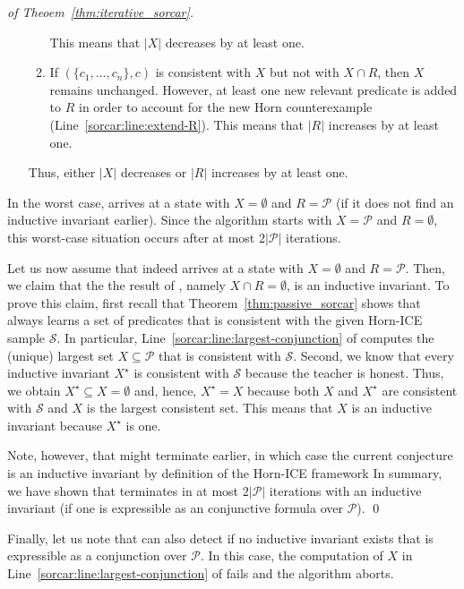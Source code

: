 \begin{proof}[of Theoem~\ref{thm:iterative_sorcar}]
\begin{itemize}
\begin{enumerate}
	    This means that $|X|$ decreases by at least one.
        \item If $(\{ c_1, \ldots, c_n \}, c)$ is consistent with $X$ but not with $X \cap R$, then
        $X$ remains unchanged.
        However, at least one new relevant predicate is added to $R$ in order to account for the new Horn counterexample (Line~\ref{sorcar:line:extend-R}).
        This means that $|R|$ increases by at least one.
	\end{enumerate}
	Thus, either $|X|$ decreases or $|R|$ increases by at least one.
\end{itemize}
In the worst case, \SorcarIterative arrives at a state with $X = \emptyset$ and $R = \mathcal P$ (if it does not find an inductive invariant earlier).
Since the algorithm starts with $X = \mathcal P$ and $R = \emptyset$, this worst-case situation occurs after at most $2 |\mathcal P|$ iterations.

Let us now assume that \SorcarIterative indeed arrives at a state with $X = \emptyset$ and $R = \mathcal P$. 
Then, we claim that the the result of \SorcarIterative, namely $X \cap R = \emptyset$, is an inductive invariant.
To prove this claim, first recall that Theorem~\ref{thm:passive_sorcar} shows that \SorcarPassive always learns a set of predicates that is consistent with the given Horn-ICE sample $\mathcal S$.
In particular, Line~\ref{sorcar:line:largest-conjunction} of \SorcarPassive computes the (unique) largest set $X \subseteq \mathcal P$ that is consistent with $\mathcal S$.
Second, we know that every inductive invariant $X^\star$ is consistent with $\mathcal S$ because the teacher is honest.
Thus, we obtain $X^\star \subseteq X = \emptyset$ and, hence, $X^\star = X$ because both $X$ and $X^\star$ are consistent with $\mathcal S$ and $X$ is the largest consistent set.
This means that $X$ is an inductive invariant because $X^\star$ is one.

Note, however, that \SorcarIterative might terminate earlier, in which case the current conjecture is an inductive invariant by definition of the Horn-ICE framework
In summary, we have shown that \SorcarIterative terminates in at most $2 |\mathcal P|$ iterations with an inductive invariant (if one is expressible as an conjunctive formula over $\mathcal P$).
\qed
\end{proof}

Finally, let us note that \SorcarIterative can also detect if no inductive invariant exists that is expressible as a conjunction over $\mathcal P$.
In this case, the computation of $X$ in Line~\ref{sorcar:line:largest-conjunction} of \SorcarPassive fails and the algorithm aborts.
